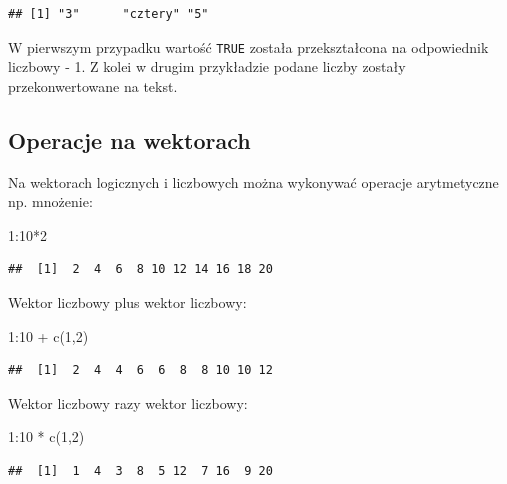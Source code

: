 \documentclass[
]{book}
\newenvironment{Shaded}{\begin{snugshade}}{\end{snugshade}}
\newcommand{\DecValTok}[1]{\textcolor[rgb]{0.00,0.00,0.81}{#1}}
\newcommand{\FunctionTok}[1]{\textcolor[rgb]{0.00,0.00,0.00}{#1}}
\newcommand{\NormalTok}[1]{#1}
\newcommand{\SpecialCharTok}[1]{\textcolor[rgb]{0.00,0.00,0.00}{#1}}
\begin{document}
\begin{verbatim}
## [1] "3"      "cztery" "5"
\end{verbatim}

W pierwszym przypadku wartość \texttt{TRUE} została przekształcona na odpowiednik liczbowy - 1. Z kolei w drugim przykładzie podane liczby zostały przekonwertowane na tekst.

\hypertarget{operacje-na-wektorach}{%
\subsection{Operacje na wektorach}\label{operacje-na-wektorach}}

Na wektorach logicznych i liczbowych można wykonywać operacje arytmetyczne np. mnożenie:

\begin{Shaded}
\begin{Highlighting}[]
\DecValTok{1}\SpecialCharTok{:}\DecValTok{10}\SpecialCharTok{*}\DecValTok{2}
\end{Highlighting}
\end{Shaded}

\begin{verbatim}
##  [1]  2  4  6  8 10 12 14 16 18 20
\end{verbatim}

Wektor liczbowy plus wektor liczbowy:

\begin{Shaded}
\begin{Highlighting}[]
\DecValTok{1}\SpecialCharTok{:}\DecValTok{10} \SpecialCharTok{+} \FunctionTok{c}\NormalTok{(}\DecValTok{1}\NormalTok{,}\DecValTok{2}\NormalTok{)}
\end{Highlighting}
\end{Shaded}

\begin{verbatim}
##  [1]  2  4  4  6  6  8  8 10 10 12
\end{verbatim}

Wektor liczbowy razy wektor liczbowy:

\begin{Shaded}
\begin{Highlighting}[]
\DecValTok{1}\SpecialCharTok{:}\DecValTok{10} \SpecialCharTok{*} \FunctionTok{c}\NormalTok{(}\DecValTok{1}\NormalTok{,}\DecValTok{2}\NormalTok{)}
\end{Highlighting}
\end{Shaded}

\begin{verbatim}
##  [1]  1  4  3  8  5 12  7 16  9 20
\end{verbatim}
\end{document}
